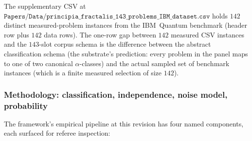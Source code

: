 \documentclass[11pt,a4paper]{amsart}
\theoremstyle{plain}
\theoremstyle{definition}
\begin{document}
The supplementary CSV at $\texttt{Papers/Data/principia\_fractalis\_143\_problems\_IBM\_dataset.csv}$ holds $142$ distinct measured-problem instances from the IBM~Quantum benchmark (header row plus $142$ data rows). The one-row gap between $142$ measured CSV instances and the $143$-slot corpus schema is the difference between the abstract classification schema (the substrate's prediction: every problem in the panel maps to one of two canonical $\alpha$-classes) and the actual sampled set of benchmark instances (which is a finite measured selection of size $142$).

\subsubsection*{Methodology: classification, independence, noise model, probability}\label{subsec:methodology}

The framework's empirical pipeline at this revision has four named components, each surfaced for referee inspection:
\end{document}

